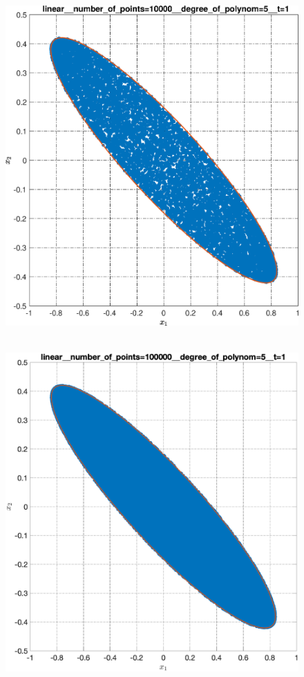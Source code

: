 \documentclass[../main.tex]{subfiles}
\begin{document}
\begin{figure}[ht!]
\begin{minipage}[b]{.3\linewidth}
  		\includegraphics[width=\linewidth]{images/linear__number_of_points=10000__degree_of_polynom=5__t=1.eps}
  	\end{minipage} 
  	\hfill
  	\begin{minipage}[b]{.3\linewidth} 
  		\small
  		\centering
  		\includegraphics[width=\linewidth]{images/linear__number_of_points=100000__degree_of_polynom=5__t=1.eps}

\end{minipage}
\end{figure}
\end{document}
